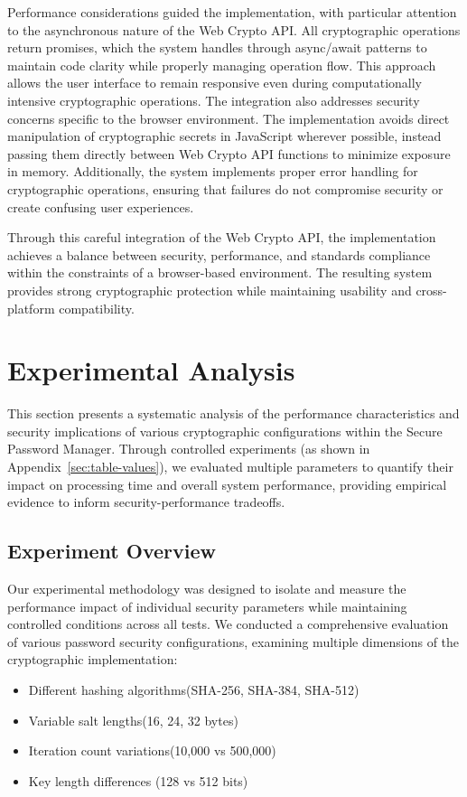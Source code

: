 \documentclass[11pt,a4paper]{article}
\begin{document}
Performance considerations guided the implementation, with particular attention to the asynchronous nature of the Web Crypto API. All cryptographic operations return promises, which the system handles through async/await patterns to maintain code clarity while properly managing operation flow. This approach allows the user interface to remain responsive even during computationally intensive cryptographic operations.
The integration also addresses security concerns specific to the browser environment. The implementation avoids direct manipulation of cryptographic secrets in JavaScript wherever possible, instead passing them directly between Web Crypto API functions to minimize exposure in memory. Additionally, the system implements proper error handling for cryptographic operations, ensuring that failures do not compromise security or create confusing user experiences.

Through this careful integration of the Web Crypto API, the implementation achieves a balance between security, performance, and standards compliance within the constraints of a browser-based environment. The resulting system provides strong cryptographic protection while maintaining usability and cross-platform compatibility.

\section{Experimental Analysis}
This section presents a systematic analysis of the performance characteristics and security implications of various cryptographic configurations within the Secure Password Manager. Through controlled experiments (as shown in Appendix~\ref{sec:table-values}), we evaluated multiple parameters to quantify their impact on processing time and overall system performance, providing empirical evidence to inform security-performance tradeoffs.

\subsection{Experiment Overview}
Our experimental methodology was designed to isolate and measure the performance impact of individual security parameters while maintaining controlled conditions across all tests. We conducted a comprehensive evaluation of various password security configurations, examining multiple dimensions of the cryptographic implementation:

\begin{itemize}
  \item Different hashing algorithms(SHA-256, SHA-384, SHA-512)
  \item Variable salt lengths(16, 24, 32 bytes)
  \item Iteration count variations(10,000 vs 500,000)
  \item Key length differences (128 vs 512 bits)
\end{itemize}
\end{document}
